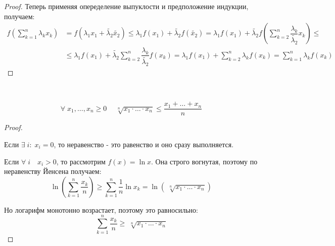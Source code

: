\documentclass[../main.tex]{subfiles}
\begin{document}
\begin{proof}
    Теперь применяя опеределение выпуклости и предположение индукции, получаем:
    \begin{equation*}
        \begin{aligned}
            f\left( \sum\limits_{ k=1}^{ n} \lambda _kx_k\right)&=f\left( \lambda _1x_1+ \tilde{ \lambda _2} \tilde{ x_2}\right) \leq \lambda _1f\left( x_1\right)+ \tilde{ \lambda _2} f\left( \tilde{ x_2}\right)=\lambda _1f\left( x_1\right)+ \tilde{ \lambda _2} f\left( \sum\limits_{ k=2}^{ n} \dfrac{ \lambda_k}{ \tilde{ \lambda _2}}x_k\right) \leq \\
            &\leq \lambda _1f\left( x_1\right)+ \tilde{ \lambda _2} \sum\limits_{ k=2}^{ n} \dfrac{ \lambda_k}{ \tilde{ \lambda _2}}f\left( x_k\right)= \lambda _1f\left( x_1\right)+ \sum\limits_{ k=2}^{ n} \lambda _kf\left( x_k\right)= \sum\limits_{ k=1}^{ n} \lambda _kf\left( x_k\right)
        \end{aligned}
    \end{equation*}
\end{proof}

\begin{crl}
    
    ~

    \[ \forall \; x_1, \ldots , x_n \geq 0\quad \;\sqrt[n]{x_1\cdot \ldots \cdot x_n} \leq \dfrac{ x_1+\ldots+x_n}{ n}\]
\end{crl}
\begin{proof}

    ~

    Если \( \exists \; i:\; x_i=0\), то неравенство - это равенство и оно сразу выполняется. 
    
    Если \( \forall \; i\quad x_i>0\), то рассмотрим 
    \( f\left( x\right)=\ln x\). Она строго вогнутая, поэтому по неравенству Йенсена получаем:
    \[ \ln\left( \sum\limits_{ k=1}^{ n} \dfrac{ x_k}{ n}\right) \geq \sum\limits_{ k=1}^{ n} \dfrac{ 1}{ n} \ln x_k= \ln \left(\;\sqrt[n]{x_1\cdot \ldots \cdot x_n}\right)\]
    
    Но логарифм монотонно возрастает, поэтому это равносильно:
    \[ \sum\limits_{ k=1}^{ n} \dfrac{ x_k}{ n} \geq \;\sqrt[n]{x_1 \cdot \ldots \cdot x_n}\]
\end{proof}
\end{document}
